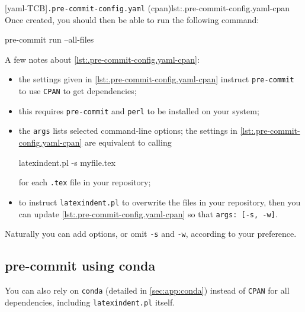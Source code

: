 		[yaml-TCB]{\texttt{.pre-commit-config.yaml} (cpan)}{lst:.pre-commit-config.yaml-cpan}
		Once created, you should then be able to run the following command:
		\begin{commandshell}
pre-commit run --all-files  
\end{commandshell}
		A few notes about \cref{lst:.pre-commit-config.yaml-cpan}:
		\begin{itemize}
			\item the settings given in \cref{lst:.pre-commit-config.yaml-cpan} instruct
			      \texttt{pre-commit} to use \texttt{CPAN} to get dependencies;
			\item this requires \texttt{pre-commit} and \texttt{perl} to be installed on your system;
			\item the \texttt{args} lists selected command-line options; the settings in
			      \cref{lst:.pre-commit-config.yaml-cpan} are equivalent to calling
			      \begin{commandshell}
latexindent.pl -s myfile.tex       
\end{commandshell}
			      for each \texttt{.tex} file in your repository;
			\item to instruct \texttt{latexindent.pl} to overwrite the files in your repository, then you
			      can update \cref{lst:.pre-commit-config.yaml-cpan} so that \texttt{args: [-s, -w]}.
		\end{itemize}

		Naturally you can add options, or omit \texttt{-s} and \texttt{-w}, according to your
		preference.

	\subsection{pre-commit using conda}\label{sec:pre-commit-conda}

		You can also rely on \texttt{conda} (detailed in \cref{sec:app:conda}) instead of
		\texttt{CPAN} for all dependencies, including \texttt{latexindent.pl} itself.
		  

